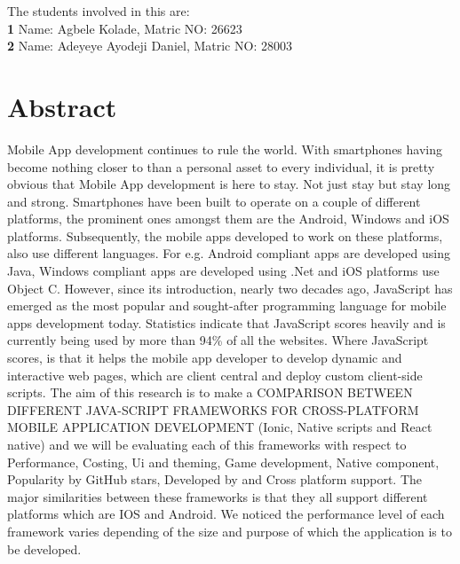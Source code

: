\documentclass[12pt]{extreport}
\begin{document}
\vspace*{0.2in}


\begin{flushleft}
{\Large
\textbf{}
}
\newline

The students involved in this are: \textsuperscript{\textpilcrow}
\\
\bigskip
\textbf{1} Name: Agbele Kolade, Matric NO: 26623
\\
\textbf{2} Name: Adeyeye Ayodeji Daniel, Matric NO: 28003
\\
\bigskip

\end{flushleft}

\newpage
\section*{Abstract}
Mobile App development continues to rule the world. With smartphones having become nothing closer to than a personal asset to every individual, it is pretty obvious that Mobile App development is here to stay. Not just stay but stay long and strong. Smartphones have been built to operate on a couple of different platforms, the prominent ones amongst them are the Android, Windows and iOS platforms. Subsequently, the mobile apps developed to work on these platforms, also use different languages. For e.g. Android compliant apps are developed using Java, Windows compliant apps are developed using .Net and iOS platforms use Object C.
However, since its introduction, nearly two decades ago, JavaScript has emerged as the most popular and sought-after programming language for mobile apps development today. Statistics indicate that JavaScript scores heavily and is currently being used by more than 94\% of all the websites. Where JavaScript scores, is that it helps the mobile app developer to develop dynamic and interactive web pages, which are client central and deploy custom client-side scripts.
The aim of this research is to make a COMPARISON BETWEEN DIFFERENT JAVA-SCRIPT FRAMEWORKS FOR CROSS-PLATFORM MOBILE APPLICATION DEVELOPMENT (Ionic, Native scripts and React native) and we will be evaluating each of this frameworks with respect to Performance, Costing, Ui and theming, Game development, Native component, Popularity by GitHub stars, Developed by and Cross platform support.
The major similarities between these frameworks is that they all support different platforms which are IOS and Android. We noticed the performance level of each framework varies depending of the size and purpose of which the application is to be developed.\begin{flushleft}
	
\end{flushleft}
\end{document}
